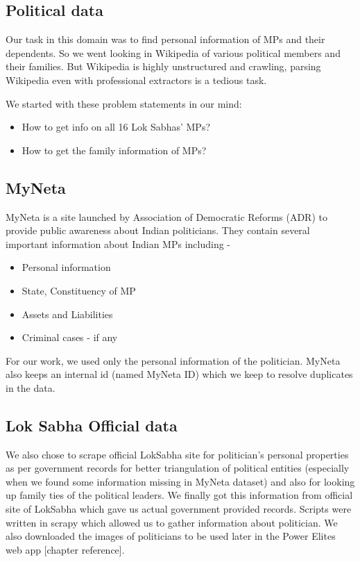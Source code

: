 \subsection{Political data}

Our task in this domain was to find personal information of MPs and their dependents. So we went looking in Wikipedia of various political members and their families. But Wikipedia is highly unstructured and crawling, parsing Wikipedia even with professional extractors is a tedious task.

We started with these problem statements in our mind:
\begin{itemize}
    \item How to get info on all 16 Lok Sabhas’ MPs?
    \item How to get the family information of MPs?
\end{itemize}
\subsection{MyNeta}
MyNeta is a site launched by Association of Democratic Reforms (ADR) to provide public awareness about Indian politicians. They contain several important information about Indian MPs including -
\begin{itemize}
    \item Personal information
    \item State, Constituency of MP
    \item Assets and Liabilities
    \item Criminal cases - if any
\end{itemize}
For our work, we used only the personal information of the politician. MyNeta also keeps an internal id (named MyNeta ID) which we keep to resolve duplicates in the data.

\subsection{Lok Sabha Official data}

We also chose to scrape official LokSabha site for politician's personal properties as per government records for better triangulation of political entities (especially when we found some information missing in MyNeta dataset) and also for looking up family ties of the political leaders.
We finally got this information from official site of LokSabha which gave us actual government provided records. Scripts were written in scrapy which allowed us to gather information about politician.
We also downloaded the images of politicians to be used later in the Power Elites web app [chapter reference].

